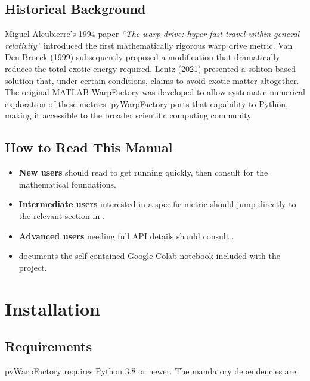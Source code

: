 \documentclass[11pt, a4paper, twoside]{report}
\begin{document}
\section{Historical Background}

Miguel Alcubierre's 1994 paper \emph{``The warp drive: hyper-fast travel
within general relativity''} introduced the first mathematically rigorous
warp drive metric.  Van Den Broeck (1999) subsequently proposed a
modification that dramatically reduces the total exotic energy required.
Lentz (2021) presented a soliton-based solution that, under certain
conditions, claims to avoid exotic matter altogether.  The original
MATLAB WarpFactory was developed to allow systematic numerical exploration
of these metrics.  pyWarpFactory ports that capability to Python,
making it accessible to the broader scientific computing community.

\section{How to Read This Manual}

\begin{itemize}
  \item \textbf{New users} should read 
        to get running quickly, then consult  for the
        mathematical foundations.
  \item \textbf{Intermediate users} interested in a specific metric should
        jump directly to the relevant section in .
  \item \textbf{Advanced users} needing full API details should consult
        .
  \item {} documents the self-contained Google Colab
        notebook included with the project.
\end{itemize}

\chapter{Installation}
\label{chap:install}

\section{Requirements}

pyWarpFactory requires Python 3.8 or newer.  The mandatory dependencies
are:
\end{document}
